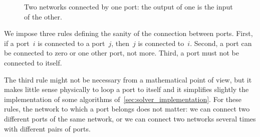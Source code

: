\begin{refsection}
\begin{figure}
    \centering
    
    \caption{Two networks connected by one port: the output of one is the input of the other.}
    \label{fig:output_g_is_input_h}
\end{figure}

We impose three rules defining the sanity of the connection between ports.
First, if a port~$i$ is connected to a port~$j$, then~$j$ is connected to~$i$.
Second, a port can be connected to zero or one other port, not more.
Third, a port must not be connected to itself.

The third rule might not be necessary from a mathematical point of view, but it makes little sense physically to loop a port to itself and it simplifies slightly the implementation of some algorithms of~\cref{sec:solver_implementation}.
For these rules, the network to which a port belongs does not matter: we can connect two different ports of the same network, or we can connect two networks several times with different pairs of ports.


\end{refsection}
